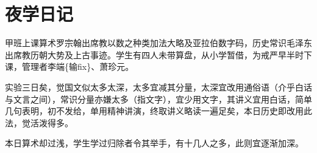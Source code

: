 \section[夜学日记（一九一七年十一月十四日）]{夜学日记}

甲班上课算术罗宗翰出席教以数之种类加法大略及亚拉伯数字码，历史常识毛泽东出席教历朝大势及上古事迹。学生有四人未带算盘，从小学暂借，为戒严早半时下课，管理者李端\{输fix\}、萧珍元。

实验三日矣，觉国文似太多太深，太多宜减其分量，太深宜改用通俗语（介乎白话与文言之间），常识分量亦嫌太多（指文字），宜少用文字，其讲义宜用白话，简单几句表明，初不发给，单用精神讲演，终取讲义略读一遍足矣，本日历史即改用此法，觉活泼得多。

本日算术却过浅，学生学过归除者令其举手，有十几人之多，此则宜逐渐加深。

